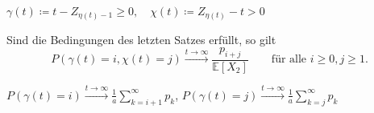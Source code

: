 \documentclass{cheat-sheet}
\newcommand{\E}{\mathbb{E}} %
\begin{document}
\begin{defn}
  $
    \gamma(t) \coloneqq t - Z_{\eta(t)-1} \geq 0, \quad
    \chi(t) \coloneqq Z_{\eta(t)} - t > 0
  $
\end{defn}

\begin{satz}
  Sind die Bedingungen des letzten Satzes erfüllt, so gilt
  \[
    P(\gamma(t)=i, \chi(t)=j) \xrightarrow{t \to \infty} \frac{p_{i+j}}{\E[X_2]}
    \qquad \text{für alle } i \geq 0, j \geq 1.
  \]
\end{satz}

\begin{kor}
  $P(\gamma(t) = i) \xrightarrow{t \to \infty} \frac{1}{a} \sum_{k=i+1}^\infty p_k$,
  $P(\gamma(t) = j) \xrightarrow{t \to \infty} \frac{1}{a} \sum_{k=j}^\infty p_k$
\end{kor}
\end{document}
